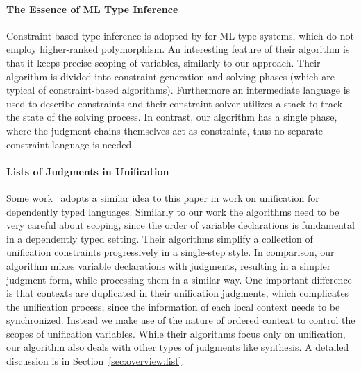\paragraph{The Essence of ML Type Inference}
Constraint-based type inference is adopted by \citet{remy-attapl} for
ML type systems, which do not employ higher-ranked polymorphism. An
interesting feature of their algorithm is that it keeps precise
scoping of variables, similarly to our approach.  Their algorithm is
divided into constraint generation and solving phases (which are
typical of constraint-based algorithms). Furthermore an intermediate
language is used to describe constraints and their constraint solver
utilizes a stack to track the state of the solving process.  In
contrast, our algorithm has a single phase, where the judgment chains
themselves act as constraints, thus no separate constraint language is
needed.


\paragraph{Lists of Judgments in Unification}
Some work~\cite{Reed2009,Abel2011higher} adopts a similar idea to this paper
in work on unification for dependently typed languages. Similarly to our work
the algorithms need to be very careful about scoping, since the order of variable
declarations is fundamental in a dependently typed setting. 
Their algorithms simplify a collection of unification constraints progressively in a single-step style.
In comparison, our algorithm mixes variable declarations with judgments,
resulting in a simpler judgment form,
while processing them in a similar way.
One important difference is that contexts are
duplicated in their unification judgments, which complicates the unification process,
since the information of each local context needs to be synchronized.
Instead we make use of the nature of ordered context to control the scopes of unification variables.
While their algorithms focus only on unification,
our algorithm also deals with other types of judgments like synthesis.
A detailed discussion is in Section~\ref{sec:overview:list}.
